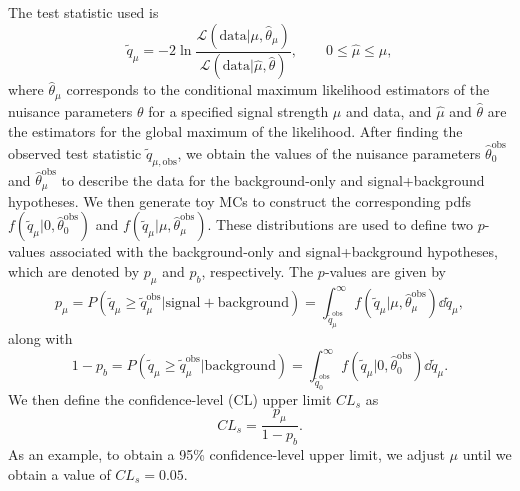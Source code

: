 The test statistic used is
\begin{equation}
  \tilde{q}_\mu=-2\ln\frac{\mathcal{L}(\mathrm{data}|\mu,\hat{\theta}_\mu)}{\mathcal{L}(\mathrm{data}|\hat{\mu},\hat{\theta})},\qquad 0\leq\hat{\mu}\leq\mu,
\end{equation}
where $\hat{\theta}_\mu$ corresponds to the conditional maximum likelihood estimators of the nuisance parameters $\theta$ for a specified signal strength $\mu$ and data, and $\hat{\mu}$ and $\hat{\theta}$ are the estimators for the global maximum of the likelihood.
After finding the observed test statistic $\tilde{q}_{\mu,\mathrm{obs}}$, we obtain the values of the nuisance parameters $\hat{\theta}_0^\mathrm{obs}$ and $\hat{\theta}_\mu^\mathrm{obs}$ to describe the data for the background-only and signal+background hypotheses.
We then generate toy MCs to construct the corresponding pdfs $f(\tilde{q}_\mu|0,\hat{\theta}_0^\mathrm{obs})$ and $f(\tilde{q}_\mu|\mu,\hat{\theta}_\mu^\mathrm{obs})$.
These distributions are used to define two $p$-values associated with the background-only and signal+background hypotheses, which are denoted by $p_\mu$ and $p_b$, respectively.
The $p$-values are given by
\begin{equation}
  p_\mu=P(\tilde{q}_\mu\geq\tilde{q}_\mu^\mathrm{obs}|\mathrm{signal}+\mathrm{background})=\int_{\tilde{q}_\mu^\mathrm{obs}}^\infty f(\tilde{q}_\mu|\mu,\hat{\theta}_\mu^\mathrm{obs})\dd{\tilde{q}_\mu},
\end{equation}
along with
\begin{equation}
  1-p_b=P(\tilde{q}_\mu\geq\tilde{q}_\mu^\mathrm{obs}|\mathrm{background})=\int_{\tilde{q}_0^\mathrm{obs}}^\infty f(\tilde{q}_\mu|0,\hat{\theta}_0^\mathrm{obs})\dd{\tilde{q}_\mu}.
\end{equation}
We then define the confidence-level (CL) upper limit $CL_s$ as
\begin{equation}
  CL_s=\frac{p_\mu}{1-p_b}.
\end{equation}
As an example, to obtain a 95\% confidence-level upper limit, we adjust $\mu$ until we obtain a value of $CL_s=0.05$.

